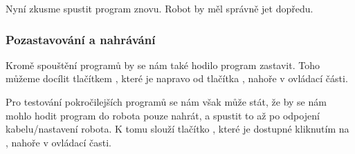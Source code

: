 \documentclass[../main.tex]{subfiles}
\begin{document}
	\begin{figure}[h!]%
		\begin{subfigure}{.49\textwidth}%
			\centering%
		\end{subfigure} \hspace{.05\textwidth}%
		\begin{subfigure}{.49\textwidth}%
			\centering%
		\end{subfigure}%
	\end{figure}

	Nyní zkusme spustit program znovu. Robot by měl správně jet dopředu.

	\subsubsection{Pozastavování a nahrávání}
	Kromě spouštění programů by se nám také hodilo program zastavit. Toho můžeme docílit tlačítkem , které je napravo od tlačítka , nahoře v ovládací části.

	Pro testování pokročilejších programů se nám však může stát, že by se nám mohlo hodit program do robota pouze nahrát, a spustit to až po odpojení kabelu/nastavení robota. K tomu slouží tlačítko , které je dostupné kliknutím na , nahoře v ovládací časti.
\end{document}
